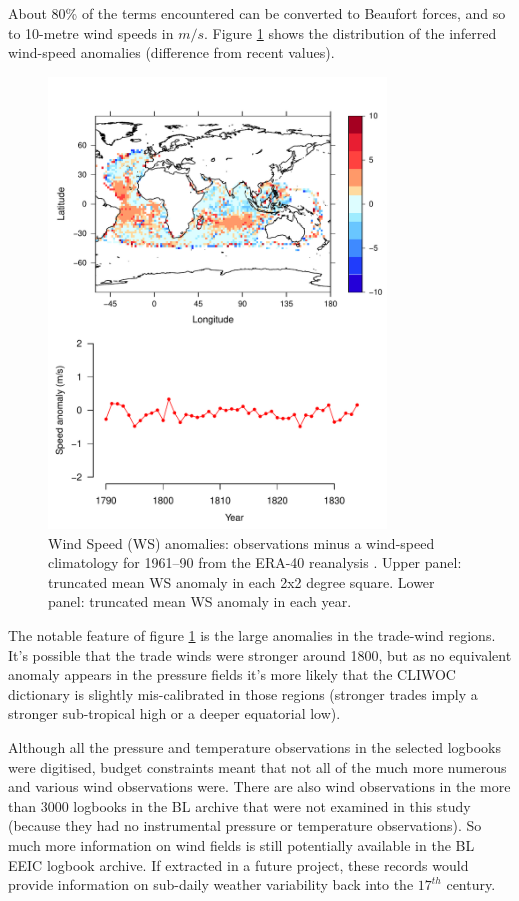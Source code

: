 \documentclass[CP]{copernicus}
\begin{document}
About 80\% of the terms encountered can be converted to Beaufort forces, and so to 10-metre wind speeds in $m/s$. Figure \ref{pwat3} shows the distribution of the inferred wind-speed anomalies (difference from recent values).
\begin{figure}[!hbp]
\begin{center}
\includegraphics[angle=0, width=0.8\textwidth]{../figures/wind_speeds}
\caption{Wind Speed (WS) anomalies: observations minus a wind-speed climatology for 1961--90 from the ERA-40 reanalysis \citep{uppala05reanalysis}. Upper panel: truncated mean WS anomaly in each 2x2 degree square. Lower panel: truncated mean WS anomaly in each year.}
\label{pwat3}
\end{center}
\end{figure}
The notable feature of figure \ref{pwat3} is the large anomalies in the trade-wind regions. It's possible that the trade winds were stronger around 1800, but as no equivalent anomaly appears in the pressure fields it's more likely that the CLIWOC dictionary is slightly mis-calibrated in those regions (stronger trades imply a stronger sub-tropical high or a deeper equatorial low).

Although all the pressure and temperature observations in the selected logbooks were digitised, budget constraints meant that not all of the much more numerous and various wind observations were. There are also wind observations in the more than 3000 logbooks in the BL archive that were not examined in this study (because they had no instrumental pressure or temperature observations). So much more information on wind fields is still potentially available in the BL EEIC logbook archive. If extracted in a future project, these records would provide information on sub-daily weather variability back into the $17^{th}$ century.
\end{document}
